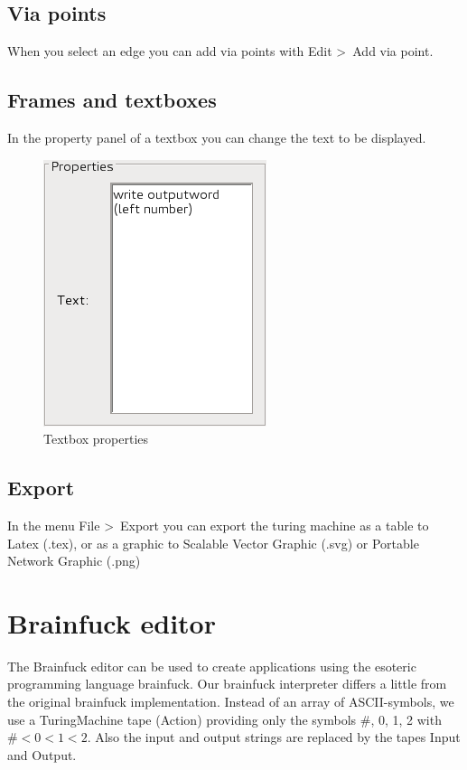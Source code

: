 \documentclass[%
  a4paper,%
  11pt,%
  blue,%
  hyperref	%
  ]{tubsartcl}
\begin{document}
\clearpage

\subsection{Via points}
\label{sec:via-points}
When you select an edge you can add via points with Edit \textgreater \ Add via point.

\subsection{Frames and textboxes}
\label{sec:frames-textboxes}
In the property panel of a textbox you can change the text to be displayed.
\begin{figure}[!htb]
\begin{center}
\includegraphics[scale=0.5]{graphics_gui/text_properties.png}
\end{center}
\caption{Textbox properties}
\label{pic:text_properties}
\end{figure}

\subsection{Export}
\label{sec:export}
In the menu File \textgreater \ Export you can export the turing machine as a table to Latex (.tex), or as a graphic to Scalable Vector Graphic (.svg) or Portable Network Graphic (.png)

\clearpage

\section{Brainfuck editor}
\label{sec:brainfuck-editor}
The Brainfuck editor  can be used to create applications using the esoteric programming language brainfuck. Our brainfuck interpreter differs a little from the original brainfuck implementation. Instead of an array of ASCII-symbols, we use a TuringMachine tape (Action) providing only the symbols \#, 0, 1, 2 with $\# < 0 < 1 < 2$. Also the input and output strings are replaced by the tapes Input and Output.\\
\end{document}

